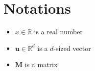 \chapter*{Notations}

\label{ref:notations}

\begin{itemize}

    \item $x \in \mathbb{R}$ is a real number \newline
    \item $\boldsymbol{u} \in \mathbb{R}^d$ is a $d$-sized vector \newline
    \item $\boldsymbol{M}$ is a matrix
    
\end{itemize}

